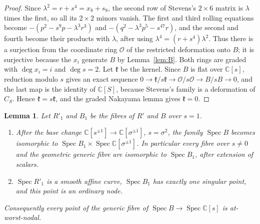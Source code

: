 \documentclass{amsart}
\newtheorem{lemma}[theorem]{Lemma}
\theoremstyle{definition}
\theoremstyle{remark}
\numberwithin{equation}{section}
\newcommand{\C}{\mathbb{C}}
\DeclareMathOperator{\Spec}{Spec}
\begin{document}
\begin{proof}
Since $\lambda^2=r+s^4=x_8+s_8$, the second row of Stevens's $2\times6$ matrix is $\lambda$ times the first, so all its $2\times2$ minors vanish. The first and third rolling equations become $-(p^2-s^9p-\lambda^3r^3)$ and $-(q^2-\lambda^3p^5-s^{47}r)$, and the second and fourth become their products with $\lambda$, after using $\lambda^4=(r+s^4)\lambda^2$. Thus there is a surjection from the coordinate ring $\mathcal O$ of the restricted deformation onto $B$; it is surjective because the $x_i$ generate $B$ by Lemma~\ref{lem:B}. Both rings are graded with $\deg x_i=i$ and $\deg s=2$. Let $\mathfrak k$ be the kernel. Since $B$ is flat over $\C[s]$, reduction modulo $s$ gives an exact sequence $0\to\mathfrak k/s\mathfrak k\to\mathcal O/s\mathcal O\to B/sB\to0$, and the last map is the identity of $\C[S]$, because Stevens's family is a deformation of $C_S$. Hence $\mathfrak k=s\mathfrak k$, and the graded Nakayama lemma gives $\mathfrak k=0$.
\end{proof}

\begin{lemma}\label{lem:fibres}
Let $R'_1$ and $B_1$ be the fibres of $R'$ and $B$ over $s=1$.
\begin{enumerate}
\item After the base change $\C[s^{\pm1}]\to\C[\sigma^{\pm1}]$, $s=\sigma^2$, the family $\Spec B$ becomes isomorphic to $\Spec B_1\times\Spec\C[\sigma^{\pm1}]$. In particular every fibre over $s\ne0$ and the geometric generic fibre are isomorphic to $\Spec B_1$, after extension of scalars.
\item $\Spec R'_1$ is a smooth affine curve, $\Spec B_1$ has exactly one singular point, and this point is an ordinary node.
\end{enumerate}
Consequently every point of the generic fibre of $\Spec B\to\Spec\C[s]$ is at-worst-nodal.
\end{lemma}
\end{document}
